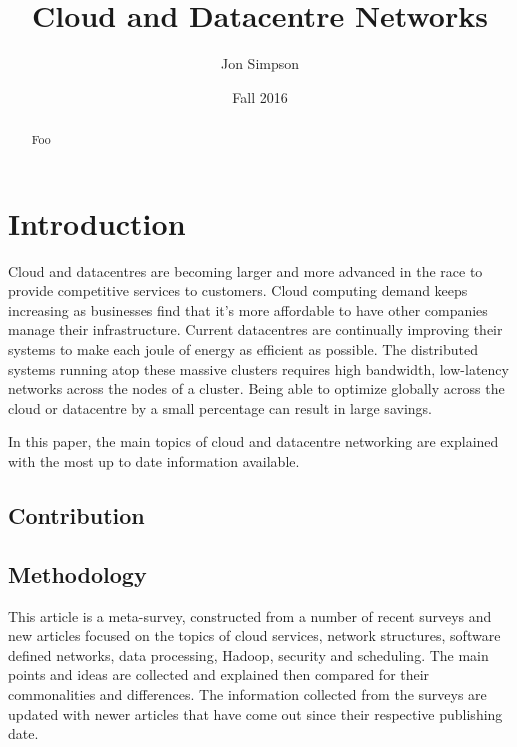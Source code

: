 \documentclass[12pt]{article}
\title{Cloud and Datacentre Networks}
\author{Jon Simpson}
\date{Fall 2016}
\begin{document}

\maketitle
\thispagestyle{empty}

\begin{abstract}
    Foo
\end{abstract}
\newpage

\tableofcontents


\section{Introduction} \label{sec:introduction}

Cloud and datacentres are becoming larger and more advanced in the race to provide competitive services to customers. Cloud computing demand keeps increasing as businesses find that it's more affordable to have other companies manage their infrastructure. Current datacentres are continually improving their systems to make each joule of energy as efficient as possible. The distributed systems running atop these massive clusters requires high bandwidth, low-latency networks across the nodes of a cluster. Being able to optimize globally across the cloud or datacentre by a small percentage can result in large savings.

In this paper, the main topics of cloud and datacentre networking are explained with the most up to date information available.



\subsection{Contribution} \label{sub:contribution}

\subsection{Methodology} \label{sub:methodology}

This article is a meta-survey, constructed from a number of recent surveys and new articles focused on the topics of cloud services, network structures, software defined networks, data processing, Hadoop, security and scheduling. The main points and ideas are collected and explained then compared for their commonalities and differences. The information collected from the surveys are updated with newer articles that have come out since their respective publishing date.
\end{document}
